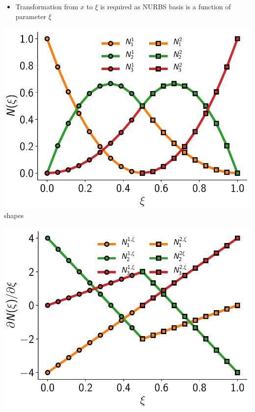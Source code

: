 \documentclass{beamer}
\begin{document}
\begin{frame}[allowframebreaks]
\begin{itemize}
\item Transformation from $x$ to $\xi$ is required as NURBS
  basis is a function of parameter $\xi$
  
  \end{itemize}
  
  \newpage

  \begin{minipage}[b]{0.48\linewidth}
    \includegraphics[width=1.0\textwidth]{figures/bar-basis-functions.pdf} \\
    \centering \footnotesize{shapes}
  \end{minipage}
  \begin{minipage}[b]{0.48\linewidth}
    \includegraphics[width=1.0\textwidth]{figures/bar-basis-function-derivatives.pdf} \\

\end{minipage}
\end{frame}
\end{document}
